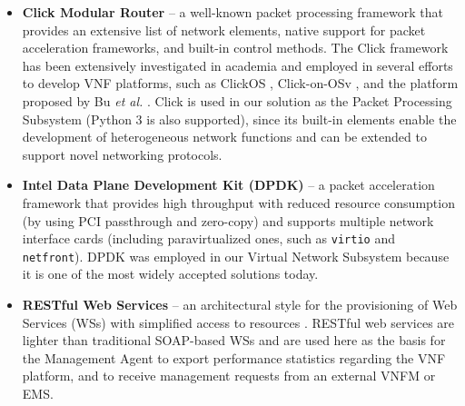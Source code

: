 \begin{itemize}
    \item \textbf{Click Modular Router} -- a well-known packet processing framework that provides an extensive list of network elements, native support for packet acceleration frameworks, and built-in control methods. The Click framework has been extensively investigated in academia and employed in several efforts to develop VNF platforms, such as ClickOS \cite{Martins-2014}, Click-on-OSv \cite{Marcuzzo-2018}, and the platform proposed by Bu \textit{et al.} \cite{Bu-2018}. Click is used in our solution as the Packet Processing Subsystem (Python 3 is also supported), since its built-in elements enable the development of heterogeneous network functions and can be extended to support novel networking protocols.


      \item \textbf{Intel Data Plane Development Kit (DPDK)} -- a packet acceleration framework that provides high throughput with reduced resource consumption (by using PCI passthrough and zero-copy) and supports multiple network interface cards (including paravirtualized ones, such as \texttt{virtio} and \texttt{netfront}). DPDK was employed in our Virtual Network Subsystem because it is one of the most widely accepted solutions today.


      \item \textbf{RESTful Web Services} -- an architectural style for the provisioning of Web Services (WSs) with simplified access to resources \cite{Roman-2005}. RESTful web services are lighter than traditional SOAP-based WSs and are used here as the basis for the Management Agent to export performance statistics regarding the VNF platform, and to receive management requests from an external VNFM or EMS.


\end{itemize}

